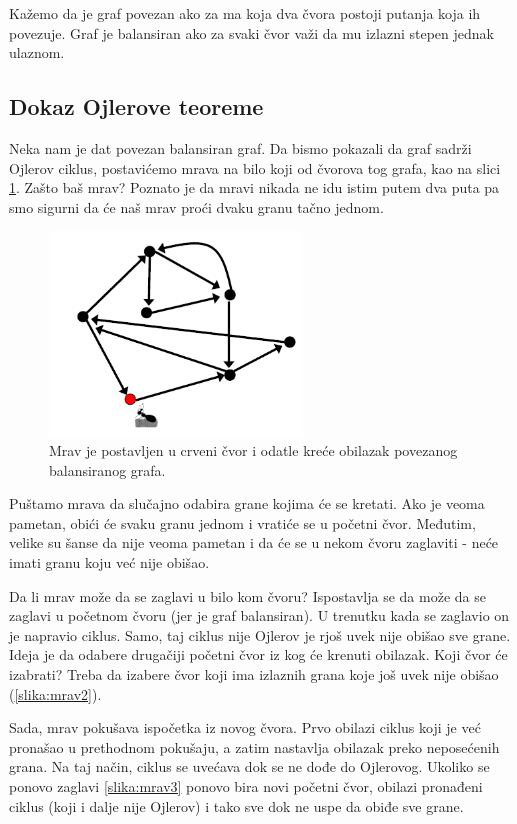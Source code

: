 Kažemo da je graf povezan ako za ma koja dva čvora postoji putanja koja ih povezuje. Graf je balansiran ako za svaki čvor važi da mu izlazni stepen jednak ulaznom.


\subsection{Dokaz Ojlerove teoreme}

Neka nam je dat povezan balansiran graf. Da bismo pokazali da graf sadrži Ojlerov ciklus, postavićemo mrava na bilo koji od čvorova tog grafa, kao na slici \ref{slika:mrav1}. Zašto baš mrav? Poznato je da mravi nikada ne idu istim putem dva puta pa smo sigurni da će naš mrav proći dvaku granu tačno jednom.

\begin{figure}[H]
	\centering
	\includegraphics[width=0.6\textwidth]{poglavlja/3/slike/mrav1.png}
	\caption{Mrav je postavljen u crveni čvor i odatle kreće obilazak povezanog balansiranog grafa.}
	\label{slika:mrav1}
\end{figure} 

Puštamo mrava da slučajno odabira grane kojima će se kretati. Ako je veoma pametan, obići će svaku granu jednom i vratiće se u početni čvor. Međutim, velike su šanse da nije veoma pametan i da će se u nekom čvoru zaglaviti - neće imati granu koju već nije obišao.

Da li mrav može da se zaglavi u bilo kom čvoru? Ispostavlja se da može da se zaglavi u početnom čvoru (jer je graf balansiran). U trenutku kada se zaglavio on je napravio ciklus. Samo, taj ciklus nije Ojlerov je rjoš uvek nije obišao sve grane. Ideja je da odabere drugačiji početni čvor iz kog će krenuti obilazak. Koji čvor će izabrati? Treba da izabere čvor koji ima izlaznih grana koje još uvek nije obišao (\ref{slika:mrav2}). 

Sada, mrav pokušava ispočetka iz novog čvora. Prvo obilazi ciklus koji je već pronašao u prethodnom pokušaju, a zatim nastavlja obilazak preko neposećenih grana. Na taj način, ciklus se uvećava dok se ne dođe do Ojlerovog. Ukoliko se ponovo zaglavi \ref{slika:mrav3} ponovo bira novi početni čvor, obilazi pronađeni ciklus (koji i dalje nije Ojlerov) i tako sve dok ne uspe da obiđe sve grane.


